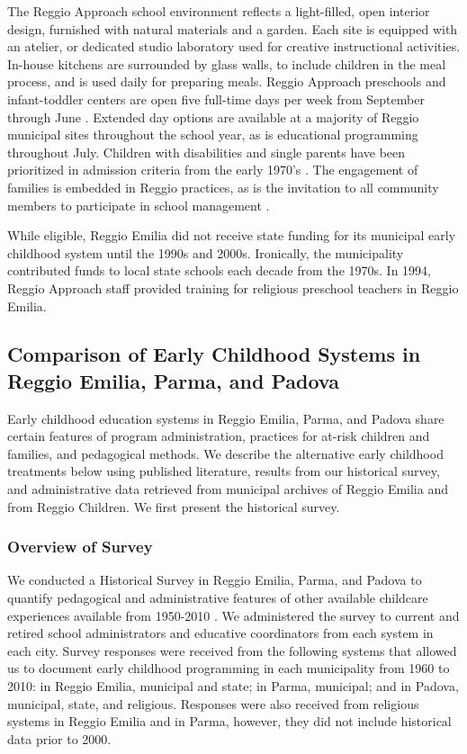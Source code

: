 The Reggio Approach school environment reflects a light-filled, open interior design, furnished with natural materials and a garden. Each site is equipped with an atelier, or dedicated studio laboratory used for creative instructional activities. In-house kitchens are surrounded by glass walls, to include children in the meal process, and is used daily for preparing meals. Reggio Approach preschools and infant-toddler centers are open five full-time days per week from September through June \citep{Giudici-Nicolosi_2014_Reggio-Approach}. Extended day options are available at a majority of Reggio municipal sites throughout the school year, as is educational programming throughout July. Children with disabilities and single parents have been prioritized in admission criteria from the early 1970's \citep{Edwards-etal-eds_1998_Hundred-Languages}. The engagement of families is embedded in Reggio practices, as is the invitation to all community members to participate in school management \citep{CEHD_2016_Historical-Analysis,Cagliari-etal-eds_2016_BOOK_Loris-Malaguzzi}. 

While eligible, Reggio Emilia did not receive state funding for its municipal early childhood system until the 1990s and 2000s. Ironically, the municipality contributed funds to local state schools each decade from the 1970s. In 1994, Reggio Approach staff provided training for religious preschool teachers in Reggio Emilia.  

\subsection{Comparison of Early Childhood Systems in Reggio Emilia, Parma, and Padova}

Early childhood education systems in Reggio Emilia, Parma, and Padova share certain features of program administration, practices for at-risk children and families, and pedagogical methods. We describe the alternative early childhood treatments below using published literature, results from our historical survey, and administrative data retrieved from municipal archives of Reggio Emilia and from Reggio Children. We first present the historical survey.

\subsubsection{Overview of Survey} \label{sec:survey-overview}

We conducted a Historical Survey in Reggio Emilia, Parma, and Padova to quantify pedagogical and administrative features of other available childcare experiences available from 1950-2010 \citep{CEHD_2016_Historical-Analysis}. We administered the survey to current and retired school administrators and educative coordinators from each system in each city. Survey responses were received from the following systems that allowed us to document early childhood programming in each municipality from 1960 to 2010: in Reggio Emilia, municipal and state; in Parma, municipal; and in Padova, municipal, state, and religious. Responses were also received from religious systems in Reggio Emilia and in Parma, however, they did not include historical data prior to 2000. 

